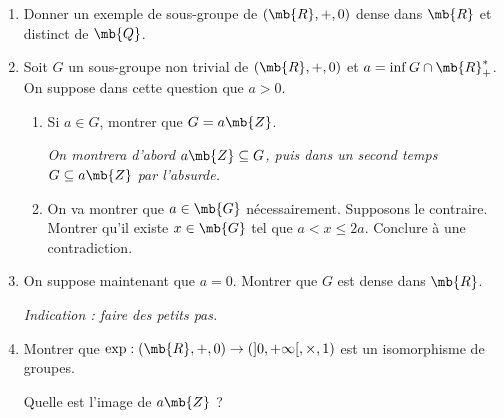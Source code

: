 
\begin{enumerate}

\item Donner un exemple de sous-groupe de $(\mb{R}, +, 0)$ dense dans $\mb{R}$ et distinct de $\mb{Q}$.

\item Soit $G$ un sous-groupe non trivial de $(\mb{R}, +, 0)$ et $a = \inf G \cap \mb{R}^*_+$. On suppose dans cette question que $a > 0$.

\begin{enumerate}

\item Si $a \in G$, montrer que $G = a \mb{Z}$.

\emph{On montrera d'abord $a\mb{Z} \subseteq G$, puis dans un second temps $G \subseteq a \mb{Z}$ par l'absurde.}

\item On va montrer que $a \in \mb{G}$ nécessairement. Supposons le contraire. Montrer qu'il existe $x \in \mb{G}$ tel que $a< x \le 2a$. Conclure à une contradiction.

\end{enumerate}

\item On suppose maintenant que $a = 0$. Montrer que $G$ est dense dans $\mb{R}$.

\emph{Indication : faire des petits pas.}

\item Montrer que $ \exp : (\mb{R}, +, 0) \rightarrow (]0, + \infty[, \times, 1)$ est un isomorphisme de groupes.

Quelle est l'image de $a \mb{Z}$ ?

\end{enumerate}

